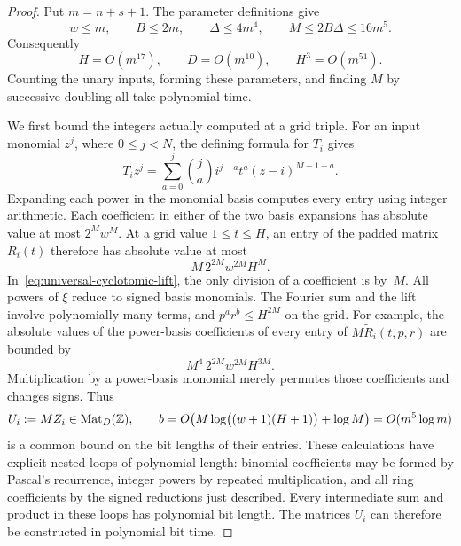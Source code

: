\begin{proof}
Put $m=n+s+1$. The parameter definitions give
\[
  w\le m,\qquad B\le2m,\qquad
  \Delta\le4m^4,\qquad M\le2B\Delta\le16m^5.
\]
Consequently
\begin{equation}
  H=O(m^{17}),\qquad D=O(m^{10}),\qquad
  H^3=O(m^{51}).
  \label{eq:generator-dimension-bounds}
\end{equation}
Counting the unary inputs, forming these parameters, and finding
$M$ by successive doubling all take polynomial time.

We first bound the integers actually computed at a grid triple.
For an input monomial $z^j$, where $0\le j<N$, the defining formula
for $T_i$ gives
\begin{equation}
  T_i z^j
    =\sum_{a=0}^j \binom ja i^{j-a}t^a(z-i)^{M-1-a}.
  \label{eq:generator-binomial-formula}
\end{equation}
Expanding each power in the monomial basis computes every entry
using integer arithmetic. Each coefficient in either of the two
basis expansions has absolute value at most $2^M w^M$. At a grid
value $1\le t\le H$, an entry of the padded matrix $R_i(t)$
therefore has absolute value at most
\[
  M\,2^{2M}w^{2M}H^M.
\]
In~\eqref{eq:universal-cyclotomic-lift}, the only division of a
coefficient is by~$M$. All powers of $\xi$ reduce to signed basis
monomials. The Fourier sum and the lift involve polynomially many
terms, and $p^a r^b\le H^{2M}$ on the grid. For example, the
absolute values of the power-basis coefficients of every entry of
$M\widetilde R_i(t,p,r)$ are bounded by
\[
  M^4\,2^{2M}w^{2M}H^{3M}.
\]
Multiplication by a power-basis monomial merely permutes those
coefficients and changes signs. Thus
\begin{equation}
  U_i:=MZ_i\in\operatorname{Mat}_D(\mathbb Z),\qquad
  b=O\!\left(M\log\bigl((w+1)(H+1)\bigr)+\log M\right)
    =O(m^5\log m)
  \label{eq:generator-input-bit-bound}
\end{equation}
is a common bound on the bit lengths of their entries. These
calculations have explicit nested loops of polynomial length:
binomial coefficients may be formed by Pascal's recurrence,
integer powers by repeated multiplication, and all ring
coefficients by the signed reductions just described. Every
intermediate sum and product in these loops has polynomial bit
length. The matrices $U_i$ can therefore be constructed in
polynomial bit time.


\end{proof}
